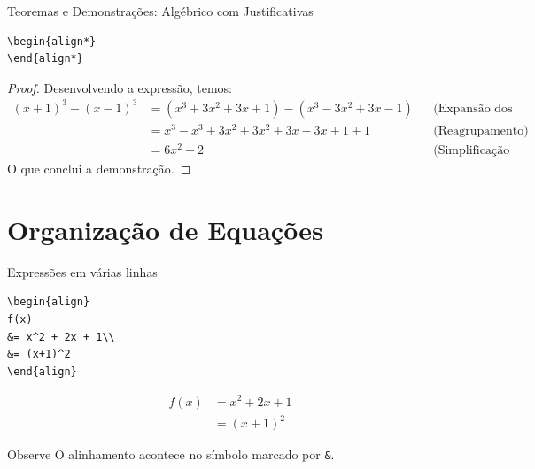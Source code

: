 \documentclass[aspectratio=169,xcolor=dvipsnames]{beamer}
\begin{document}
\begin{frame}[fragile]{Teoremas e Demonstrações: Algébrico com Justificativas}

\begin{lstlisting}
\begin{align*}
\end{align*}
\end{lstlisting}

   \begin{proof}
    Desenvolvendo a expressão, temos:
    \begin{align*}
    (x+1)^3 - (x-1)^3 &= (x^3 + 3x^2 + 3x + 1) - (x^3 - 3x^2 + 3x - 1) && \text{(Expansão dos cubos)} \\
                    &= x^3 - x^3 + 3x^2 + 3x^2 + 3x - 3x + 1 + 1 && \text{(Reagrupamento)} \\
                    &= 6x^2 + 2 && \text{(Simplificação final)}
    \end{align*}
    O que conclui a demonstração.
    \end{proof}

\end{frame}


\section{Organização de Equações}

\begin{frame}[fragile]{Expressões em várias linhas}

\begin{lstlisting}
\begin{align}
f(x)
&= x^2 + 2x + 1\\
&= (x+1)^2
\end{align}
\end{lstlisting}

    \[
        \begin{aligned}
            f(x)
            &=x^2+2x+1\\
            &=(x+1)^2
        \end{aligned}
    \]

    \begin{alertblock}{Observe}
        O alinhamento acontece no símbolo marcado por \texttt{\&}.
    \end{alertblock}

\end{frame}
\end{document}
